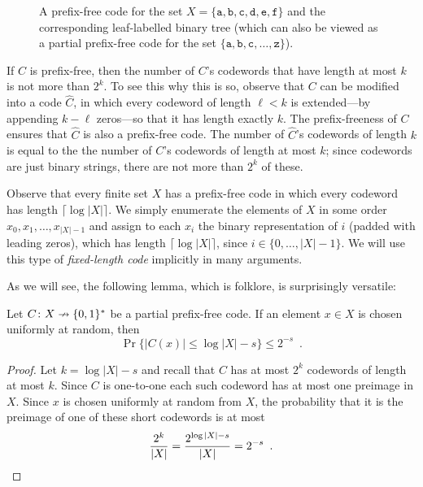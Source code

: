 \documentclass{patmorin}
\begin{document}
\begin{figure}
  \caption{A prefix-free code for the set
    $X=\{\mathtt{a},\mathtt{b},\mathtt{c},\mathtt{d},\mathtt{e},\mathtt{f}\}$
    and the corresponding leaf-labelled binary tree (which can also be
    viewed as a partial prefix-free code for the set
    $\{\mathtt{a},\mathtt{b},\mathtt{c},\ldots,\mathtt{z}\}$).}
\end{figure}

If $C$ is prefix-free, then the number of $C$'s codewords that have
length at most $k$ is not more than $2^k$. To see this why this is so,
observe that $C$ can be modified into a code $\hat C$, in which every
codeword of length $\ell <k$ is extended---by appending $k-\ell$
zeros---so that it has length exactly $k$. The prefix-freeness of $C$
ensures that $\hat C$ is also a prefix-free code. The number of $\hat
C$'s codewords of length $k$ is equal to the the number of $C$'s
codewords of length at most $k$; since codewords are just binary
strings, there are not more than $2^k$ of these.

Observe that every finite set $X$ has a prefix-free code in which
every codeword has length $\lceil\log |X|\rceil$. We simply enumerate
the elements of $X$ in some order $x_0,x_1,\ldots,x_{|X|-1}$ and
assign to each $x_i$ the binary representation of $i$ (padded with
leading zeros), which has length $\lceil\log |X|\rceil$, since
$i\in\{0,\ldots,|X|-1\}$.  We will use this type of \emph{fixed-length
  code} implicitly in many arguments.


As we will see, the following lemma, which is folklore, is
surprisingly versatile:
\begin{lem}
  Let $C\colon X\nrightarrow \{0,1\}^*$ be a partial prefix-free
  code. If an element $x\in X$ is chosen uniformly at random, then
  \[
    \Pr\{|C(x)|\le \log|X|-s\}\le 2^{-s} \enspace .
  \]
\end{lem}

\begin{proof}
  Let $k=\log|X|-s$ and recall that $C$ has at most $2^{k}$ codewords
  of length at most $k$.  Since $C$ is one-to-one each such codeword
  has at most one preimage in $X$.  Since $x$ is chosen uniformly at
  random from $X$, the probability that it is the preimage of one of
  these short codewords is at most
  \[
  \frac{2^k}{|X|} = \frac{2^{\log|X|-s}}{|X|} = 2^{-s} \enspace
  . \qedhere
  \]
\end{proof}
\end{document}
